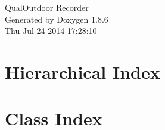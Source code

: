 \documentclass[twoside]{book}
\newcommand{\clearemptydoublepage}{%
  \newpage{\pagestyle{empty}\cleardoublepage}%
}
\begin{document}
\hypersetup{pageanchor=false}
\begin{titlepage}
\vspace*{7cm}
\begin{center}%
{\Large Qual\-Outdoor Recorder }\\
\vspace*{1cm}
{\large Generated by Doxygen 1.8.6}\\
\vspace*{0.5cm}
{\small Thu Jul 24 2014 17:28:10}\\
\end{center}
\end{titlepage}
\clearemptydoublepage
\tableofcontents
\clearemptydoublepage
{}
\hypersetup{pageanchor=true}

\chapter{Hierarchical Index}

\chapter{Class Index}

\end{document}
